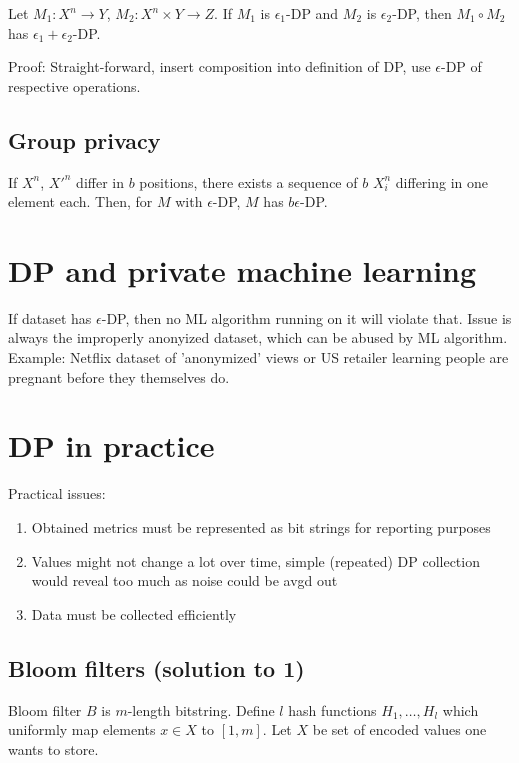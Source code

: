 \documentclass[a4paper]{scrreprt}
\begin{document}
Let $M_1 : X^n \rightarrow Y$, $M_2 : X^n \times Y \rightarrow Z$. If $M_1$ is
$\epsilon_1$-DP and $M_2$ is $\epsilon_2$-DP, then $M_1 \circ M_2$ has
$\epsilon_1 + \epsilon_2$-DP.

Proof: Straight-forward, insert composition into definition of DP, use
$\epsilon$-DP of respective operations.

\subsection{Group privacy}

If $X^n$, $X'^n$ differ in $b$ positions, there exists a sequence of $b$
$X_i^n$ differing in one element each. Then, for $M$ with $\epsilon$-DP, $M$
has $b \epsilon$-DP.

\section{DP and private machine learning}

If dataset has $\epsilon$-DP, then no ML algorithm running on it will violate
that. Issue is always the improperly anonyized dataset, which can be abused by
ML algorithm. Example: Netflix dataset of 'anonymized' views or US retailer
learning people are pregnant before they themselves do.

\section{DP in practice}

Practical issues:
\begin{enumerate}
		\item Obtained metrics must be represented as bit strings for reporting
				purposes
		\item Values might not change a lot over time, simple (repeated) DP
				collection would reveal too much as noise could be avgd out
		\item Data must be collected efficiently
\end{enumerate}

\subsection{Bloom filters (solution to 1)}

Bloom filter $B$ is $m$-length bitstring. Define $l$ hash functions $H_1,
\ldots, H_l$ which uniformly map elements $x \in X$ to $[1, m]$. Let $X$ be set
of encoded values one wants to store.
\end{document}
